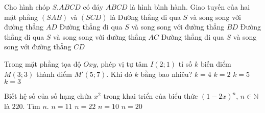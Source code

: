 \begin{ex}%
Cho hình chóp $S.ABCD$ có đáy $ABCD$ là hình bình hành. Giao tuyến của hai mặt phẳng $(SAB)$ và $(SCD)$ là
\choice
{Đường thẳng đi qua $S$ và song song với đường thẳng $AD$}
{Đường thẳng đi qua $S$ và song song với đường thẳng $BD$}
{Đường thẳng đi qua $S$ và song song với đường thẳng $AC$}
{\True Đường thẳng đi qua $S$ và song song với đường thẳng $CD$}
\end{ex}

\begin{ex}%
Trong mặt phẳng tọa độ $Oxy$, phép vị tự tâm $I(2; 1)$ tỉ số $k$ biến điểm $M(3; 3)$ thành điểm $M'(5; 7)$. Khi đó $k$ bằng bao nhiêu?
\choice
{$k=4$}
{$k=2$}
{$k=5$}
{\True $k=3$}
\end{ex}

\begin{ex}%
Biết hệ số của số hạng chứa $x^2$ trong khai triển của biểu thức $(1-2x)^n$, $n\in\mathbb{N}$ là $220$. Tìm $n$.
\choice
{\True $n=11$}
{$n=22$}
{$n=10$}
{$n=20$}
\end{ex}

